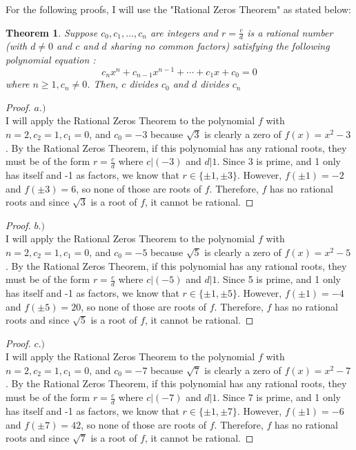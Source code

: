 \documentclass[10pt,a4paper]{article}
\newtheorem{theorem}{Theorem}
\begin{document}
For the following proofs, I will use the "Rational Zeros Theorem" as stated below:
\begin{theorem}
Suppose $c_0, c_1, \dots, c_n$ are integers and $r = \frac{c}{d}$ is a rational number (with $d \neq 0$ and $c$ and $d$ sharing no common factors) satisfying the following polynomial equation :
\[c_nx^n + c_{n-1}x^{n-1} + \cdots + c_1x + c_0 = 0\]
where $n \geq 1, c_n \neq 0$. Then, $c$ divides $c_0$ and $d$ divides $c_n$
\end{theorem}

\begin{proof}{$a.)$}
\\I will apply the Rational Zeros Theorem to the polynomial $f$ with $n = 2, c_2 = 1, c_1 = 0$, and $c_0 = -3$ because $\sqrt{3}$ is clearly a zero of $f(x) = x^2 - 3$. By the Rational Zeros Theorem, if this polynomial has any rational roots, they must be of the form $r = \frac{c}{d}$ where $c|(-3)$ and $d|1$. Since 3 is prime, and 1 only has itself and -1 as factors, we know that $r \in \{\pm 1,\pm 3\}$. However, $f(\pm 1) = -2$ and $f(\pm 3) = 6$, so none of those are roots of $f$. Therefore, $f$ has no rational roots and since $\sqrt{3}$ is a root of $f$, it cannot be rational. 
\end{proof}

\begin{proof}{$b.)$}
\\I will apply the Rational Zeros Theorem to the polynomial $f$ with $n = 2, c_2 = 1, c_1 = 0$, and $c_0 = -5$ because $\sqrt{5}$ is clearly a zero of $f(x) = x^2 - 5$. By the Rational Zeros Theorem, if this polynomial has any rational roots, they must be of the form $r = \frac{c}{d}$ where $c|(-5)$ and $d|1$. Since 5 is prime, and 1 only has itself and -1 as factors, we know that $r \in \{\pm 1,\pm 5\}$. However, $f(\pm 1) = -4$ and $f(\pm 5) = 20$, so none of those are roots of $f$. Therefore, $f$ has no rational roots and since $\sqrt{5}$ is a root of $f$, it cannot be rational. 
\end{proof}

\begin{proof}{$c.)$}
\\I will apply the Rational Zeros Theorem to the polynomial $f$ with $n = 2, c_2 = 1, c_1 = 0$, and $c_0 = -7$ because $\sqrt{7}$ is clearly a zero of $f(x) = x^2 - 7$. By the Rational Zeros Theorem, if this polynomial has any rational roots, they must be of the form $r = \frac{c}{d}$ where $c|(-7)$ and $d|1$. Since 7 is prime, and 1 only has itself and -1 as factors, we know that $r \in \{\pm 1,\pm 7\}$. However, $f(\pm 1) = -6$ and $f(\pm 7) = 42$, so none of those are roots of $f$. Therefore, $f$ has no rational roots and since $\sqrt{7}$ is a root of $f$, it cannot be rational. 
\end{proof}
\end{document}
